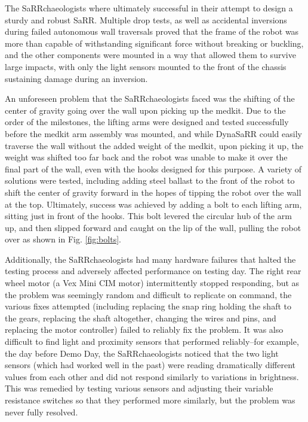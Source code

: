 The SaRRchaeologists where ultimately successful in their attempt to design a sturdy and robust SaRR. Multiple drop tests, as well as accidental inversions during failed autonomous wall traversals proved that the frame of the robot was more than capable of withstanding significant force without breaking or buckling, and the other components were mounted in a way that allowed them to survive large impacts, with only the light sensors mounted to the front of the chassis sustaining damage during an inversion.

An unforeseen problem that the SaRRchaeologists faced was the shifting of the center of gravity going over the wall upon picking up the medkit. Due to the order of the milestones, the lifting arms were designed and tested successfully before the medkit arm assembly was mounted, and while DynaSaRR could easily traverse the wall without the added weight of the medkit, upon picking it up, the weight was shifted too far back and the robot was unable to make it over the final part of the wall, even with the hooks designed for this purpose. A variety of solutions were tested, including adding steel ballast to the front of the robot to shift the center of gravity forward in the hopes of tipping the robot over the wall at the top. Ultimately, success was achieved by adding a bolt to each lifting arm, sitting just in front of the hooks. This bolt levered the circular hub of the arm up, and then slipped forward and caught on the lip of the wall, pulling the robot over as shown in Fig. \ref{fig:bolts}.

Additionally, the SaRRchaeologists had many hardware failures that halted the testing process and adversely affected performance on testing day. The right rear wheel motor (a Vex Mini CIM motor) intermittently stopped responding, but as the problem was seemingly random and difficult to replicate on command, the various fixes attempted (including replacing the snap ring holding the shaft to the gears, replacing the shaft altogether, changing the wires and pins, and replacing the motor controller) failed to reliably fix the problem. It was also difficult to find light and proximity sensors that performed reliably--for example, the day before Demo Day, the SaRRchaeologists noticed that the two light sensors (which had worked well in the past) were reading dramatically different values from each other and did not respond similarly to variations in brightness. This was remedied by testing various sensors and adjusting their variable resistance switches so that they performed more similarly, but the problem was never fully resolved.

